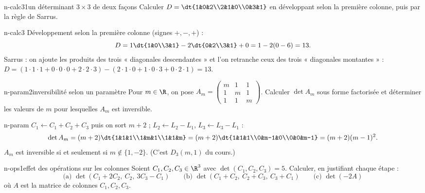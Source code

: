 \begin{exo}{n-calc3}{1}{un déterminant $3\times3$ de deux façons}
Calculer $D=\dt{1&0&2\\2&1&0\\0&3&1}$ en développant selon la première colonne, puis par la règle de Sarrus.
\end{exo}

\begin{corrige}{n-calc3}
Développement selon la première colonne (signes $+,-,+$) :
\[D=1\dt{1&0\\3&1}-2\dt{0&2\\3&1}+0=1-2(0-6)=13.\]
Sarrus : on ajoute les produits des trois « diagonales descendantes » et l'on retranche ceux des trois « diagonales montantes » :
$D=(1\cdot1\cdot1+0\cdot0\cdot0+2\cdot2\cdot3)-(2\cdot1\cdot0+1\cdot0\cdot3+0\cdot2\cdot1)=13$.
\end{corrige}

\begin{exo}{n-param}{2}{inversibilité selon un paramètre}
Pour $m\in\R$, on pose $A_m=\begin{pmatrix}m&1&1\\1&m&1\\1&1&m\end{pmatrix}$. Calculer $\det A_m$ sous forme factorisée et déterminer les valeurs de $m$ pour lesquelles $A_m$ est inversible.
\end{exo}

\begin{corrige}{n-param}
$C_1\leftarrow C_1+C_2+C_3$ puis on sort $m+2$ ; $L_2\leftarrow L_2-L_1$, $L_3\leftarrow L_3-L_1$ :
\[\det A_m=(m+2)\dt{1&1&1\\1&m&1\\1&1&m}=(m+2)\dt{1&1&1\\0&m-1&0\\0&0&m-1}=(m+2)(m-1)^2.\]
$A_m$ est inversible si et seulement si $m\notin\{1,-2\}$. (C'est $D_3(m,1)$ du cours.)
\end{corrige}

\begin{exo}{n-ops}{1}{effet des opérations sur les colonnes}
Soient $C_1,C_2,C_3\in\R^3$ avec $\det(C_1,C_2,C_3)=5$. Calculer, en justifiant chaque étape :
\[\text{(a) }\det(C_1+2C_2,\ C_2,\ 3C_3-C_1)\qquad\text{(b) }\det(C_1+C_2,\ C_2+C_3,\ C_3+C_1)\qquad\text{(c) }\det(-2A)\]
où $A$ est la matrice de colonnes $C_1,C_2,C_3$.
\end{exo}

